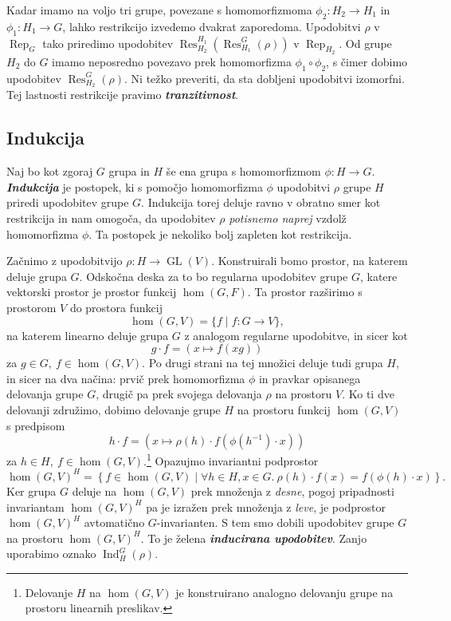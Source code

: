 \documentclass[11pt]{book}
\DeclareMathOperator\Res{Res}
\DeclareMathOperator\Ind{Ind}
\DeclareMathOperator\Rep{Rep}
\DeclareMathOperator\GL{GL}
\def\definicija{\color{rdeca}\bf\em}
\theoremstyle{definition}
\theoremstyle{zgled}
\theoremstyle{odprtproblem}
\theoremstyle{domacanaloga}
\theoremstyle{izrek}
\begin{document}
Kadar imamo na voljo tri grupe, povezane s homomorfizmoma $\phi_2 \colon H_2 \to H_1$ in $\phi_1 \colon H_1 \to G$, lahko restrikcijo izvedemo dvakrat zaporedoma. Upodobitvi $\rho$ v $\Rep_G$ tako priredimo upodobitev $\Res^{H_1}_{H_2}(\Res^G_{H_1}(\rho))$ v $\Rep_{H_2}$. Od grupe $H_2$ do $G$ imamo neposredno povezavo prek homomorfizma $\phi_1 \circ \phi_2$, s čimer dobimo upodobitev $\Res^G_{H_2}(\rho)$. Ni težko preveriti, da sta dobljeni upodobitvi izomorfni. Tej lastnosti restrikcije pravimo {\definicija tranzitivnost}.

\subsection{Indukcija}

Naj bo kot zgoraj $G$ grupa in $H$ še ena grupa s homomorfizmom $\phi \colon H \to G$. {\definicija Indukcija} je postopek, ki s pomočjo homomorfizma $\phi$ upodobitvi $\rho$ grupe $H$ priredi upodobitev grupe $G$. Indukcija torej deluje ravno v obratno smer kot restrikcija in nam omogoča, da upodobitev $\rho$ \emph{potisnemo naprej} vzdolž homomorfizma $\phi$. Ta postopek je nekoliko bolj zapleten kot restrikcija.

Začnimo z upodobitvijo $\rho \colon H \to \GL(V)$. Konstruirali bomo prostor, na katerem deluje grupa $G$. Odskočna deska za to bo regularna upodobitev grupe $G$, katere vektorski prostor je prostor funkcij $\hom(G,F)$. Ta prostor razširimo s prostorom $V$ do prostora funkcij
\[
    \hom(G,V) = \{ f \mid f \colon G \to V \},
\]
na katerem linearno deluje grupa $G$ z analogom regularne upodobitve, in sicer kot
\[
    g \cdot f = \left( x \mapsto f(xg) \right)
\]
za $g \in G, \ f \in \hom(G,V)$. Po drugi strani na tej množici deluje tudi grupa $H$, in sicer na dva načina: prvič prek homomorfizma $\phi$ in pravkar opisanega delovanja grupe $G$, drugič pa prek svojega delovanja $\rho$ na prostoru $V$. Ko ti dve delovanji združimo, dobimo delovanje grupe $H$ na prostoru funkcij
$\hom(G,V)$ s predpisom
\[
    h \cdot f = \left( x \mapsto \rho(h) \cdot f \left( \phi(h^{-1}) \cdot x \right) \right)
\]
za $h \in H, \ f \in \hom(G,V)$.\footnote{Delovanje $H$ na $\hom(G,V)$ je konstruirano analogno delovanju grupe na prostoru linearnih preslikav.} Opazujmo invariantni podprostor
\[
    \hom(G, V)^H =
    \left\{ f \in \hom(G,V) \mid \forall h \in H, x \in G. \ \rho(h) \cdot f(x) = f \left(\phi(h) \cdot x\right)\right\}.
\]
Ker grupa $G$ deluje na $\hom(G,V)$ prek množenja z \emph{desne}, pogoj pripadnosti invariantam $\hom(G,V)^H$ pa je izražen prek množenja z \emph{leve}, je podprostor $\hom(G,V)^H$ avtomatično $G$-invarianten. S tem smo dobili upodobitev grupe $G$ na prostoru $\hom(G,V)^H$. To je želena {\definicija inducirana upodobitev}. Zanjo uporabimo oznako $\Ind^G_H(\rho)$.
\end{document}
